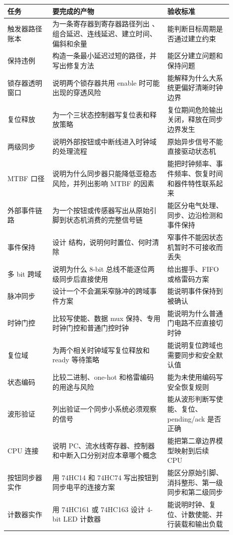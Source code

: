 \begin{longtable}{L{0.18\linewidth}L{0.46\linewidth}L{0.26\linewidth}}
\toprule
任务 & 要完成的产物 & 验收标准 \\
\midrule
触发器路径账本 & 为一条寄存器到寄存器路径列出 、组合延迟、连线延迟、建立时间、偏斜和余量 & 能判断目标周期是否通过建立约束 \\
保持违例 & 构造一条最小延迟过短的路径，并写出修复方法 & 能区分建立问题和保持问题 \\
锁存器透明窗口 & 说明两个锁存器共用 enable 时可能出现的穿透风险 & 能解释为什么大系统更偏好清晰时钟边界 \\
复位释放 & 为一个三状态控制器写复位表和释放策略 & 复位期间危险输出关闭，释放在同步边界发生 \\
两级同步 & 说明外部按钮或中断线进入时钟域的处理流程 & 原始异步信号不能直接驱动状态机 \\
MTBF 口径 & 说明为什么同步器只能降低亚稳态风险，并列出影响 MTBF 的因素 & 能把时钟频率、事件频率、恢复时间和器件特性联系起来 \\
外部事件链路 & 为一个按钮或传感器写出从原始引脚到状态机消费的完整信号链 & 能区分电气处理、同步、边沿检测和事件保持 \\
事件保持 & 设计  结构，说明何时置位、何时清除 & 窄事件不能因状态机暂时不可接收而丢失 \\
多 bit 跨域 & 说明为什么 8-bit 总线不能逐位两级同步后直接使用 & 给出握手、FIFO 或格雷码方案 \\
脉冲同步 & 设计一个不会漏采窄脉冲的跨域事件方案 & 能说明事件保持到被确认 \\
时钟门控 & 比较写使能、数据 mux 保持、专用时钟门控和普通门控时钟 & 能说明为什么普通门电路不应直接切时钟 \\
复位域 & 为两个相关时钟域写复位释放和 ready 等待策略 & 能说明复位跨域也需要同步和安全默认值 \\
状态编码 & 比较二进制、one-hot 和格雷编码的用途与风险 & 能为未使用编码写安全恢复规则 \\
波形验证 & 列出验证一个同步小系统必须观察的信号 & 能从波形判断写使能、复位、pending/ack 是否正确 \\
CPU 连接 & 说明 PC、流水线寄存器、控制器和中断入口分别对应本章哪个概念 & 能把第二章边界模型映射到后续 CPU \\
按钮同步器实作 & 用 74HC14 和 74HC74 写出按钮到同步电平的连接方案 & 能区分原始引脚、消抖整形、第一级同步和第二级同步 \\
计数器实作 & 用 74HC161 或 74HC163 设计 4-bit LED 计数器 & 能说明时钟、复位、计数使能、并行装载和输出负载 \\

\end{longtable}
